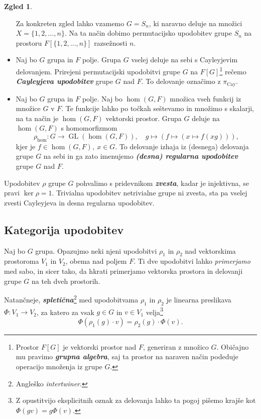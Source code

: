 \documentclass[11pt]{book}
\DeclareMathOperator\GL{GL}
\DeclareMathOperator\Cay{Cay}
\def\definicija{\color{rdeca}\bf\em}
\theoremstyle{definition}
\theoremstyle{zgled}
\newtheorem*{zgled}{Zgled}
\theoremstyle{odprtproblem}
\theoremstyle{domacanaloga}
\theoremstyle{izrek}
\begin{document}
\begin{zgled}
\begin{itemize}
        Za konkreten zgled lahko vzamemo $G = S_n$, ki naravno deluje na množici $X = \{ 1, 2, \dots, n \}$. Na ta način dobimo permutacijsko upodobitev grupe $S_n$ na prostoru $F[\{ 1, 2, \dots, n \}]$ razsežnosti $n$.
        \item Naj bo $G$ grupa in $F$ polje. Grupa $G$ vselej deluje na sebi s Cayleyjevim delovanjem. Prirejeni permutacijski upodobitvi grupe $G$ na $F[G]$\footnote{Prostor $F[G]$ je vektorski prostor nad $F$, generiran z množico $G$. Običajno mu pravimo {\definicija grupna algebra}, saj ta prostor na naraven način podeduje operacijo množenja iz grupe $G$.} rečemo {\definicija Cayleyjeva upodobitev} grupe $G$ nad $F$. To delovanje označimo z $\pi_{\Cay}$.
        \item Naj bo $G$ grupa in $F$ polje. Naj bo $\hom(G,F)$ množica vseh funkcij iz množice $G$ v $F$. Te funkcije lahko po točkah seštevamo in množimo s skalarji, na ta način je $\hom(G,F)$ vektorski prostor. Grupa $G$ deluje na $\hom(G,F)$ s homomorfizmom
        \[
            \rho_{\hom} \colon G \to \GL(\hom(G,F)), \quad
            g \mapsto \left( f \mapsto \left( x \mapsto f(xg) \right) \right),
        \]
        kjer je $f \in \hom(G,F), \ x \in G$. To delovanje izhaja iz (desnega) delovanja grupe $G$ na sebi in ga zato imenujemo {\definicija (desna) regularna upodobitev} grupe $G$ nad $F$.
    \end{itemize}
\end{zgled}

Upodobitev $\rho$ grupe $G$ pohvalimo s pridevnikom {\definicija zvesta}, kadar je injektivna, se pravi $\ker \rho = 1$. Trivialna upodobitev netrivialne grupe ni zvesta, sta pa vselej zvesti Cayleyjeva in desna regularna upodobitev. 

\subsection{Kategorija upodobitev}

Naj bo $G$ grupa. Opazujmo neki njeni upodobitvi $\rho_1$ in $\rho_2$ nad vektorskima prostoroma $V_1$ in $V_2$, obema nad poljem $F$. Ti dve upodobitvi lahko \emph{primerjamo} med sabo, in sicer tako, da hkrati primerjamo vektorska prostora in delovanji grupe $G$ na teh dveh prostorih. 

Natančneje, {\definicija spletična}\footnote{Angleško \emph{intertwiner}.} med upodobitvama $\rho_1$ in $\rho_2$ je linearna preslikava $\Phi \colon V_1 \to V_2$, za katero za vsak $g \in G$ in $v \in V_1$ velja\footnote{Z opustitvijo eksplicitnih oznak za delovanja lahko ta pogoj pišemo krajše kot $\Phi(gv) = g\Phi(v)$.}
\[
  \Phi(\rho_1(g) \cdot v) = \rho_2(g) \cdot \Phi(v).
\]
\end{document}
